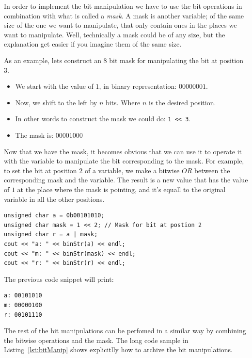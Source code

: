 In order to implement the bit manipulation we have to use the bit operations in combination with what is called a \emph{mask}.
A mask is another variable; of the same size of the one we want to manipulate, that only contain ones in the places we want to manipulate.
Well, technically a mask could be of any size, but the explanation get easier if you imagine them of the same size.

As an example, lets construct an $8$ bit mask for manipulating the bit at position $3$.
\begin{itemize}
 \item We start with the value of $1$, in binary representation: $00000001$.
 \item Now, we shift to the left by $n$ bits. Where $n$ is the desired position.
 \item In other words to construct the mask we could do: \texttt{1 << 3}.
 \item The mask is: $00001000$
\end{itemize}

Now that we have the mask, it becomes obvious that we can use it to operate it with the variable to manipulate the bit corresponding to the mask.
For example, to set the bit at position $2$ of a variable, we make a bitwise $OR$ between the corresponding mask and the variable.
The result is a new value that has the value of $1$ at the place where the mask is pointing, and it's equall to the original variable in all the other positions.

\begin{verbatim}
unsigned char a = 0b00101010;
unsigned char mask = 1 << 2; // Mask for bit at postion 2
unsigned char r = a | mask;
cout << "a: " << binStr(a) << endl;
cout << "m: " << binStr(mask) << endl;
cout << "r: " << binStr(r) << endl;
\end{verbatim}
The previous code snippet will print:
\begin{verbatim}
a: 00101010
m: 00000100
r: 00101110
\end{verbatim}

The rest of the bit manipulations can be perfomed in a similar way by combining the bitwise operations and the mask.
The long code sample in Listing~\ref{lst:bitManip} shows explicitlly how to archive the bit manipulations.

{\centering
\begin{minipage}{\linewidth}
\end{minipage}
\par
}

